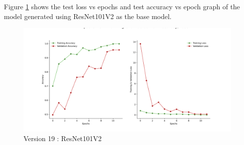 Figure \ref{fig:resnet101v2} shows the test loss vs epochs and test accuracy vs epoch graph of the model generated using ResNet101V2 as the base model.
\begin{figure}[H]
\includegraphics[scale=0.29]{Photos/ResNet101V2_plot.png}
\caption{Version 19 : ResNet101V2} \label{fig:resnet101v2}
\end{figure}


